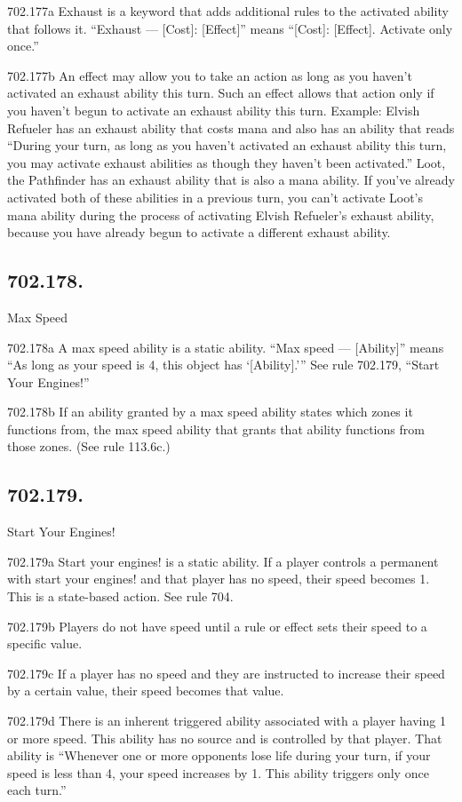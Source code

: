 702.177a Exhaust is a keyword that adds additional rules to the activated ability that follows it. “Exhaust — [Cost]: [Effect]” means “[Cost]: [Effect]. Activate only once.”

702.177b An effect may allow you to take an action as long as you haven’t activated an exhaust ability this turn. Such an effect allows that action only if you haven’t begun to activate an exhaust ability this turn.
Example: Elvish Refueler has an exhaust ability that costs mana and also has an ability that reads “During your turn, as long as you haven’t activated an exhaust ability this turn, you may activate exhaust abilities as though they haven’t been activated.” Loot, the Pathfinder has an exhaust ability that is also a mana ability. If you’ve already activated both of these abilities in a previous turn, you can’t activate Loot’s mana ability during the process of activating Elvish Refueler’s exhaust ability, because you have already begun to activate a different exhaust ability.

\subsection*{702.178.}
Max Speed

702.178a A max speed ability is a static ability. “Max speed — [Ability]” means “As long as your speed is 4, this object has ‘[Ability].’” See rule 702.179, “Start Your Engines!”

702.178b If an ability granted by a max speed ability states which zones it functions from, the max speed ability that grants that ability functions from those zones. (See rule 113.6c.)

\subsection*{702.179.}
Start Your Engines!

702.179a Start your engines! is a static ability. If a player controls a permanent with start your engines! and that player has no speed, their speed becomes 1. This is a state-based action. See rule 704.

702.179b Players do not have speed until a rule or effect sets their speed to a specific value.

702.179c If a player has no speed and they are instructed to increase their speed by a certain value, their speed becomes that value.

702.179d There is an inherent triggered ability associated with a player having 1 or more speed. This ability has no source and is controlled by that player. That ability is “Whenever one or more opponents lose life during your turn, if your speed is less than 4, your speed increases by 1. This ability triggers only once each turn.”

